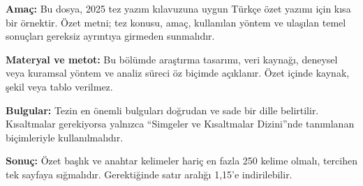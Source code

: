 \textbf{Amaç:} Bu dosya, 2025 tez yazım kılavuzuna uygun Türkçe özet yazımı için kısa bir örnektir. Özet metni; tez konusu, amaç, kullanılan yöntem ve ulaşılan temel sonuçları gereksiz ayrıntıya girmeden sunmalıdır.

\textbf{Materyal ve metot:} Bu bölümde araştırma tasarımı, veri kaynağı, deneysel veya kuramsal yöntem ve analiz süreci öz biçimde açıklanır. Özet içinde kaynak, şekil veya tablo verilmez.

\textbf{Bulgular:} Tezin en önemli bulguları doğrudan ve sade bir dille belirtilir. Kısaltmalar gerekiyorsa yalnızca ``Simgeler ve Kısaltmalar Dizini''nde tanımlanan biçimleriyle kullanılmalıdır.

\textbf{Sonuç:} Özet başlık ve anahtar kelimeler hariç en fazla 250 kelime olmalı, tercihen tek sayfaya sığmalıdır. Gerektiğinde satır aralığı 1,15'e indirilebilir.
